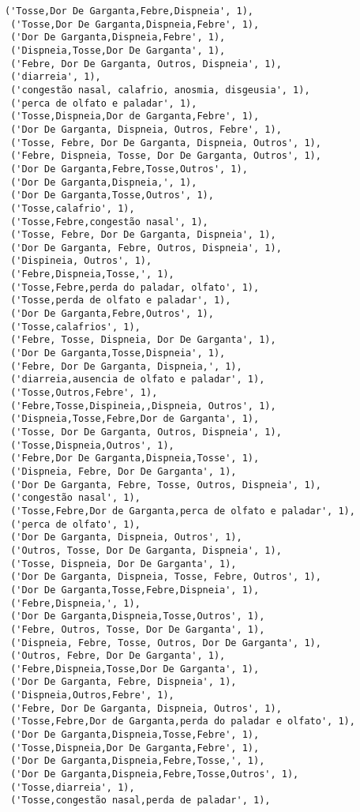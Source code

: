 \documentclass[11pt]{article}
\begin{document}
\begin{tcolorbox}[breakable, size=fbox, boxrule=.5pt, pad at break*=1mm, opacityfill=0]
\begin{Verbatim}[commandchars=\\\{\}]
 ('Tosse,Dor De Garganta,Febre,Dispneia', 1),
 ('Tosse,Dor De Garganta,Dispneia,Febre', 1),
 ('Dor De Garganta,Dispneia,Febre', 1),
 ('Dispneia,Tosse,Dor De Garganta', 1),
 ('Febre, Dor De Garganta, Outros, Dispneia', 1),
 ('diarreia', 1),
 ('congestão nasal, calafrio, anosmia, disgeusia', 1),
 ('perca de olfato e paladar', 1),
 ('Tosse,Dispneia,Dor de Garganta,Febre', 1),
 ('Dor De Garganta, Dispneia, Outros, Febre', 1),
 ('Tosse, Febre, Dor De Garganta, Dispneia, Outros', 1),
 ('Febre, Dispneia, Tosse, Dor De Garganta, Outros', 1),
 ('Dor De Garganta,Febre,Tosse,Outros', 1),
 ('Dor De Garganta,Dispneia,', 1),
 ('Dor De Garganta,Tosse,Outros', 1),
 ('Tosse,calafrio', 1),
 ('Tosse,Febre,congestão nasal', 1),
 ('Tosse, Febre, Dor De Garganta, Dispneia', 1),
 ('Dor De Garganta, Febre, Outros, Dispneia', 1),
 ('Dispineia, Outros', 1),
 ('Febre,Dispneia,Tosse,', 1),
 ('Tosse,Febre,perda do paladar, olfato', 1),
 ('Tosse,perda de olfato e paladar', 1),
 ('Dor De Garganta,Febre,Outros', 1),
 ('Tosse,calafrios', 1),
 ('Febre, Tosse, Dispneia, Dor De Garganta', 1),
 ('Dor De Garganta,Tosse,Dispneia', 1),
 ('Febre, Dor De Garganta, Dispneia,', 1),
 ('diarreia,ausencia de olfato e paladar', 1),
 ('Tosse,Outros,Febre', 1),
 ('Febre,Tosse,Dispineia,,Dispneia, Outros', 1),
 ('Dispneia,Tosse,Febre,Dor de Garganta', 1),
 ('Tosse, Dor De Garganta, Outros, Dispneia', 1),
 ('Tosse,Dispneia,Outros', 1),
 ('Febre,Dor De Garganta,Dispneia,Tosse', 1),
 ('Dispneia, Febre, Dor De Garganta', 1),
 ('Dor De Garganta, Febre, Tosse, Outros, Dispneia', 1),
 ('congestão nasal', 1),
 ('Tosse,Febre,Dor de Garganta,perca de olfato e paladar', 1),
 ('perca de olfato', 1),
 ('Dor De Garganta, Dispneia, Outros', 1),
 ('Outros, Tosse, Dor De Garganta, Dispneia', 1),
 ('Tosse, Dispneia, Dor De Garganta', 1),
 ('Dor De Garganta, Dispneia, Tosse, Febre, Outros', 1),
 ('Dor De Garganta,Tosse,Febre,Dispneia', 1),
 ('Febre,Dispneia,', 1),
 ('Dor De Garganta,Dispneia,Tosse,Outros', 1),
 ('Febre, Outros, Tosse, Dor De Garganta', 1),
 ('Dispneia, Febre, Tosse, Outros, Dor De Garganta', 1),
 ('Outros, Febre, Dor De Garganta', 1),
 ('Febre,Dispneia,Tosse,Dor De Garganta', 1),
 ('Dor De Garganta, Febre, Dispneia', 1),
 ('Dispneia,Outros,Febre', 1),
 ('Febre, Dor De Garganta, Dispneia, Outros', 1),
 ('Tosse,Febre,Dor de Garganta,perda do paladar e olfato', 1),
 ('Dor De Garganta,Dispneia,Tosse,Febre', 1),
 ('Tosse,Dispneia,Dor De Garganta,Febre', 1),
 ('Dor De Garganta,Dispneia,Febre,Tosse,', 1),
 ('Dor De Garganta,Dispneia,Febre,Tosse,Outros', 1),
 ('Tosse,diarreia', 1),
 ('Tosse,congestão nasal,perda de paladar', 1),

\end{Verbatim}
\end{tcolorbox}
\end{document}
